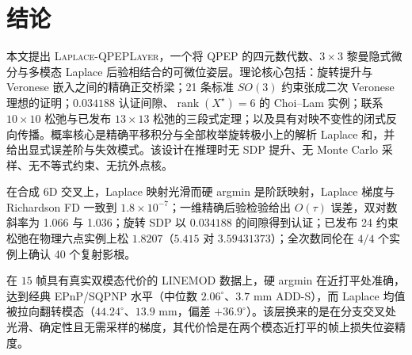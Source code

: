 \section{结论}\label{sec:conclusion}

本文提出 \textsc{Laplace-QPEPLayer}，一个将 QPEP 的四元数代数、$3\times3$ 黎曼隐式微分与多模态 Laplace 后验相结合的可微位姿层。理论核心包括：旋转提升与 Veronese 嵌入之间的精确正交桥梁；21 条标准 $SO(3)$ 约束张成二次 Veronese 理想的证明；$0.034188$ 认证间隙、$\operatorname{rank}(X^\star)=6$ 的 Choi--Lam 实例；联系 $10\times10$ 松弛与已发布 $13\times13$ 松弛的三段式定理；以及具有对映不变性的闭式反向传播。概率核心是精确平移积分与全部枚举旋转极小上的解析 Laplace 和，并给出显式误差阶与失效模式。该设计在推理时无 SDP 提升、无 Monte Carlo 采样、无不等式约束、无抗外点核。

在合成 6D 交叉上，Laplace 映射光滑而硬 argmin 是阶跃映射，Laplace 梯度与 Richardson FD 一致到 $1.8\times10^{-7}$；一维精确后验检验给出 $O(\tau)$ 误差，双对数斜率为 1.066 与 1.036；旋转 SDP 以 $0.034188$ 的间隙得到认证；已发布 24 约束松弛在物理六点实例上松 $1.8207$（$5.415$ 对 $3.59431373$）；全次数同伦在 $4/4$ 个实例上确认 40 个复射影根。

在 $15$ 帧具有真实双模态代价的 LINEMOD 数据上，硬 argmin 在近打平处准确，达到经典 EPnP/SQPNP 水平（中位数 $2.06^\circ$、$3.7$ mm ADD-S），而 Laplace 均值被拉向翻转模态（$44.24^\circ$、$13.9$ mm，偏差 $+36.9^\circ$）。该层换来的是在分支交叉处光滑、确定性且无需采样的梯度，其代价恰是在两个模态近打平的帧上损失位姿精度。
